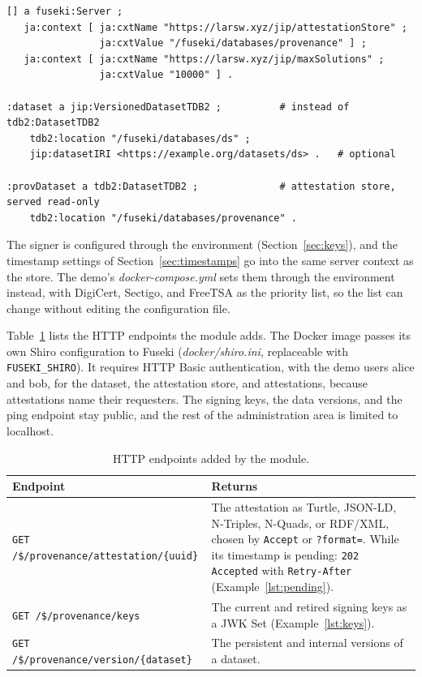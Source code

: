 \documentclass[11pt,a4paper]{article}
\newcommand{\code}[1]{\texttt{#1}}
\newcommand{\file}[1]{\textit{#1}}
\begin{document}
\begin{lstlisting}[language=Turtle, caption={Fuseki configuration for the versioned dataset and the attestation store (excerpt of \textit{docker/config.ttl}).}, label={lst:config}]
[] a fuseki:Server ;
   ja:context [ ja:cxtName "https://larsw.xyz/jip/attestationStore" ;
                ja:cxtValue "/fuseki/databases/provenance" ] ;
   ja:context [ ja:cxtName "https://larsw.xyz/jip/maxSolutions" ;
                ja:cxtValue "10000" ] .

:dataset a jip:VersionedDatasetTDB2 ;          # instead of tdb2:DatasetTDB2
    tdb2:location "/fuseki/databases/ds" ;
    jip:datasetIRI <https://example.org/datasets/ds> .   # optional

:provDataset a tdb2:DatasetTDB2 ;              # attestation store, served read-only
    tdb2:location "/fuseki/databases/provenance" .
\end{lstlisting}

The signer is configured through the environment (Section~\ref{sec:keys}), and the timestamp
settings of Section~\ref{sec:timestamps} go into the same server context as the store. The
demo's \file{docker-compose.yml} sets them through the environment instead, with DigiCert,
Sectigo, and FreeTSA as the priority list, so the list can change without editing the
configuration file.

Table~\ref{tab:endpoints} lists the HTTP endpoints the module adds. The Docker image passes
its own Shiro configuration to Fuseki (\file{docker/shiro.ini}, replaceable with
\code{FUSEKI\_SHIRO}). It requires HTTP Basic authentication, with the demo users alice and
bob, for the dataset, the attestation store, and attestations, because attestations name their
requesters. The signing keys, the data versions, and the ping endpoint stay public, and the rest
of the administration area is limited to localhost.

\begin{table}[ht]
\centering
\caption{HTTP endpoints added by the module.}
\label{tab:endpoints}
\small
\begin{tabularx}{\linewidth}{@{}>{\raggedright\arraybackslash}p{62mm}>{\raggedright\arraybackslash}X@{}}
\toprule
Endpoint & Returns \\
\midrule
\code{GET /\$/provenance/attestation/\{uuid\}} & The attestation as Turtle, JSON-LD, N-Triples,
N-Quads, or RDF/XML, chosen by \code{Accept} or \code{?format=}. While its timestamp is
pending: \code{202 Accepted} with \code{Retry-After} (Example~\ref{lst:pending}). \\
\code{GET /\$/provenance/keys} & The current and retired signing keys as a JWK Set
(Example~\ref{lst:keys}). \\
\code{GET /\$/provenance/version/\{dataset\}} & The persistent and internal versions of a
dataset. \\
\bottomrule
\end{tabularx}
\end{table}
\end{document}
